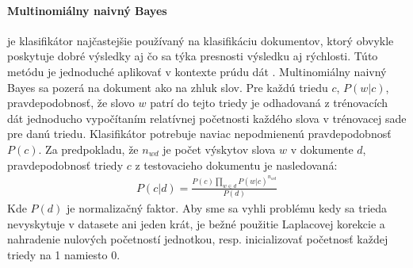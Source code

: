 \paragraph{Multinomiálny naivný Bayes} je klasifikátor najčastejšie používaný na klasifikáciu dokumentov, ktorý obvykle poskytuje dobré výsledky aj čo sa týka presnosti výsledku aj rýchlosti. Túto metódu je jednoduché aplikovať v kontexte prúdu dát \citep{bifet2010sentiment}. Multinomiálny naivný Bayes sa pozerá na dokument ako na zhluk slov. Pre každú triedu $c$, $P(w|c)$, pravdepodobnosť, že slovo $w$ patrí do tejto triedy je odhadovaná z trénovacích dát jednoducho vypočítaním relatívnej početnosti každého slova v trénovacej sade pre danú triedu. Klasifikátor potrebuje naviac nepodmienenú pravdepodobnosť $P(c)$. Za predpokladu, že $\displaystyle n_{wd}$ je počet výskytov slova $w$ v dokumente $d$, pravdepodobnosť triedy $c$ z testovacieho dokumentu je nasledovaná: \newline
\begin{align*}
P(c|d) = \frac{P(c)\prod _{w \in d} P(w|c)^{n_{wd}}} {P(d)}
\end{align*}
Kde $P(d)$ je normalizačný faktor. Aby sme sa vyhli problému kedy sa trieda nevyskytuje v datasete ani jeden krát, je bežné použitie Laplacovej korekcie a nahradenie nulových početností jednotkou, resp. inicializovať početnosť každej triedy na 1 namiesto 0.

